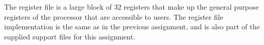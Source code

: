 The register file is a large block of 32 registers that make up the general purpose registers of the processor that are accessible to users.
The register file implementation is the same as in the previous assignment\cite{assignment-1}, and is also part of the supplied support files for this assignment.
